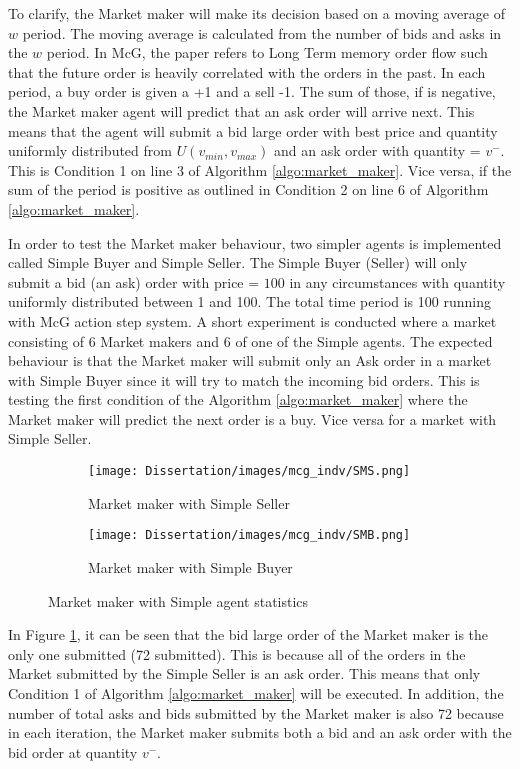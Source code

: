 To clarify, the Market maker will make its decision based on a moving average of $w$ period. The moving average is calculated from the number of bids and asks in the $w$ period. In McG, the paper refers to Long Term memory order flow such that the future order is heavily correlated with the orders in the past. In each period, a buy order is given a +1 and a sell -1. The sum of those, if is negative, the Market maker agent will predict that an ask order will arrive next. This means that the agent will submit a bid large order with best price and quantity uniformly distributed from $U(v_{min},v_{max})$ and an ask order with quantity = $v^-$. This is Condition 1 on line 3 of Algorithm \ref{algo:market_maker}. Vice versa, if the sum of the period is positive as outlined in Condition 2 on line 6 of Algorithm \ref{algo:market_maker}. 

In order to test the Market maker behaviour, two simpler agents is implemented called Simple Buyer and Simple Seller. The Simple Buyer (Seller) will only submit a bid (an ask) order with price = $100$ in any circumstances with quantity uniformly distributed between 1 and 100. The total time period is 100 running with McG action step system. A short experiment is conducted where a market consisting of 6 Market makers and 6 of one of the Simple agents. The expected behaviour is that the Market maker will submit only an Ask order in a market with Simple Buyer since it will try to match the incoming bid orders. This is testing the first condition of the Algorithm \ref{algo:market_maker} where the Market maker will predict the next order is a buy. Vice versa for a market with Simple Seller. 

\begin{figure}[h]
  \begin{subfigure}[b]{0.5\textwidth}
    \texttt{[image: Dissertation/images/mcg\_indv/SMS.png]}
    \caption{Market maker with Simple Seller}
    \label{fig:indv_mm_1}
  \end{subfigure}
  \begin{subfigure}[b]{0.5\textwidth}
    \texttt{[image: Dissertation/images/mcg\_indv/SMB.png]}
    \caption{Market maker with Simple Buyer}
    \label{fig:indv_mm_2}
  \end{subfigure}
\caption{Market maker with Simple agent statistics} 
\end{figure}
\FloatBarrier

In Figure \ref{fig:indv_mm_1}, it can be seen that the bid large order of the Market maker is the only one submitted (72 submitted). This is because all of the orders in the Market submitted by the Simple Seller is an ask order. This means that only Condition 1 of Algorithm \ref{algo:market_maker} will be executed.  In addition, the number of total asks and bids submitted by the Market maker is also 72 because in each iteration, the Market maker submits both a bid and an ask order with the bid order at quantity $v^-$. 

